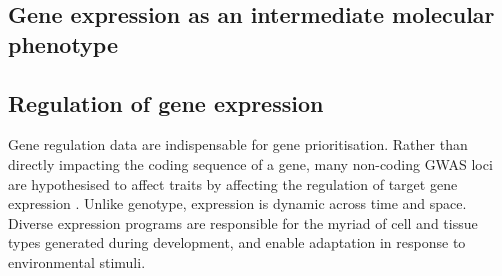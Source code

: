 \begin{outline}
%

\section{Gene expression as an intermediate molecular phenotype}

\subsection{Regulation of gene expression}


Gene regulation data are indispensable for gene prioritisation. 
Rather than directly impacting the coding sequence of a gene, 
many non-coding \gls{GWAS} loci are hypothesised to affect traits by affecting the regulation of target gene expression \autocite{gallagher2018PostGWASEraAssociation,cano-gamez2020GWASFunctionUsing}.
Unlike genotype, expression is dynamic across time and space.
Diverse expression programs are responsible for the myriad of cell and tissue types generated during development,
and enable adaptation in response to environmental stimuli.


\end{outline}
